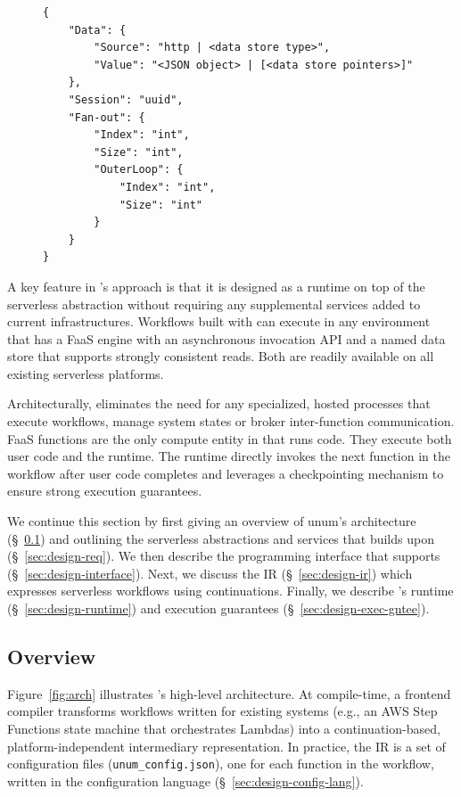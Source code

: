 \begin{figure}[]
    \begin{verbatim}
{
    "Data": {
        "Source": "http | <data store type>",
        "Value": "<JSON object> | [<data store pointers>]"
    },
    "Session": "uuid",
	"Fan-out": {
        "Index": "int",
        "Size": "int",
        "OuterLoop": {
            "Index": "int",
            "Size": "int"
        }
    }
}
    \end{verbatim}
    \caption{}
    \label{fig:input-format}
\end{figure}

A key feature in \name{}'s approach is that it is designed as a runtime on top
of the serverless abstraction without requiring any supplemental services
added to current infrastructures. Workflows built with \name{} can execute in
any environment that has a FaaS engine with an asynchronous invocation API and
a named data store that supports strongly consistent reads. Both are readily
available on all existing serverless platforms.

Architecturally, \name{} eliminates the need for any specialized, hosted
processes that execute workflows, manage system states or broker
inter-function communication. FaaS functions are the only compute entity in
\name{} that runs code. They execute both user code and the \name{} runtime. The
\name{} runtime directly invokes the next function in the workflow after user
code completes and leverages a checkpointing mechanism to ensure strong
execution guarantees.

We continue this section by first giving an overview of unum's architecture
(\S~\ref{sec:design-overview}) and outlining the serverless abstractions and
services that \name{} builds upon (\S~\ref{sec:design-req}). We then
describe the programming interface that \name{} supports
(\S~\ref{sec:design-interface}). Next, we discuss the \name{} IR
(\S~\ref{sec:design-ir}) which expresses serverless workflows using
continuations. Finally, we describe \name{}'s runtime
(\S~\ref{sec:design-runtime}) and execution guarantees
(\S~\ref{sec:design-exec-gntee}).

\subsection{Overview}\label{sec:design-overview}

Figure~\ref{fig:arch} illustrates \name{}'s high-level architecture. At
compile-time, a frontend compiler transforms workflows written for existing
systems (e.g., an AWS Step Functions state machine that orchestrates Lambdas)
into a continuation-based, platform-independent intermediary representation.
In practice, the IR is a set of configuration files
(\texttt{unum\_config.json}), one for each function in the workflow, written
in the \name{} configuration language (\S~\ref{sec:design-config-lang}).

